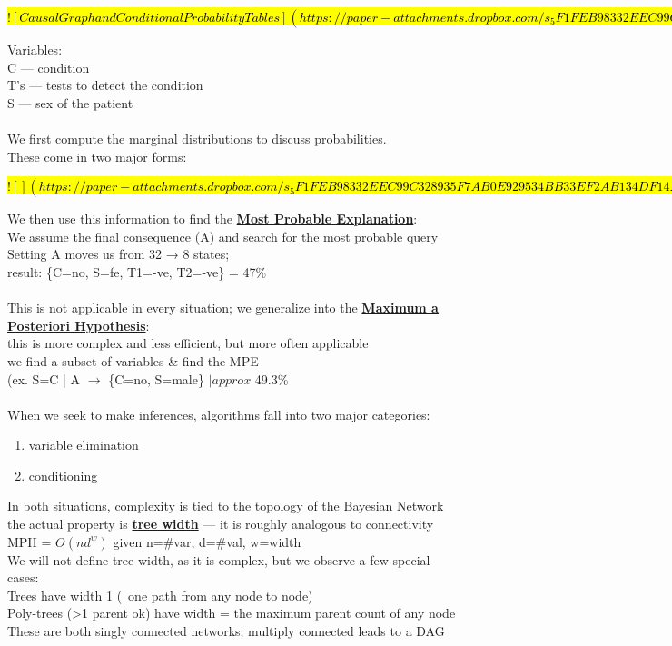 \documentclass[../../lecture_notes.tex]{subfiles}
\begin{document}
\hl{
$![Causal Graph and Conditional Probability Tables](https://paper-attachments.dropbox.com/s_5F1FEB98332EEC99C328935F7AB0E929534BB33EF2AB134DF14A85072ADC65A0_1590219806142_Screen+Shot+2020-05-23+at+12.43.14+AM.png)$
}

\noindent Variables:\\
	\indent C — condition\\
	\indent T’s — tests to detect the condition\\
	\indent S — sex of the patient\\
\\
We first compute the marginal distributions to discuss probabilities.\\
These come in two major forms:

\hl{
$![](https://paper-attachments.dropbox.com/s_5F1FEB98332EEC99C328935F7AB0E929534BB33EF2AB134DF14A85072ADC65A0_1590220321908_Untitled+drawing+5.jpg)$
}

\noindent We then use this information to find the \textbf{\underline{Most Probable Explanation}}:\\
We assume the final consequence (A) and search for the most probable query\\
	\indent Setting A moves us from 32 → 8 states;\\
	\indent result: \{C=no, S=fe, T1=-ve, T2=-ve\} = 47\%\\
\\
This is not applicable in every situation; we generalize into the \textbf{\underline{Maximum a Posteriori Hypothesis}}:\\
	\indent this is more complex and less efficient, but more often applicable\\
	\indent we find a subset of variables \& find the MPE\\
	\indent (ex. S=C | A $\rightarrow$ \{C=no, S=male\} $|approx$ 49.3\%\\
\\
When we seek to make inferences, algorithms fall into two major categories:
\begin{enumerate} [itemsep=0mm]
	\item variable elimination
	\item conditioning
\end{enumerate} \medskip

\noindent In both situations, complexity is tied to the topology of the Bayesian Network\\
	\indent the actual property is \textbf{\underline{tree width}} — it is roughly analogous to connectivity\\
	\indent MPH = $O(nd^w)$ given n=\#var, d=\#val, w=width\\
We will not define tree width, as it is complex, but we observe a few special cases:\\
	\indent Trees have width 1 (~one path from any node to node)\\
	\indent Poly-trees (>1 parent ok) have width = the maximum parent count of any node\\
These are both singly connected networks; multiply connected leads to a DAG\\
\end{document}
